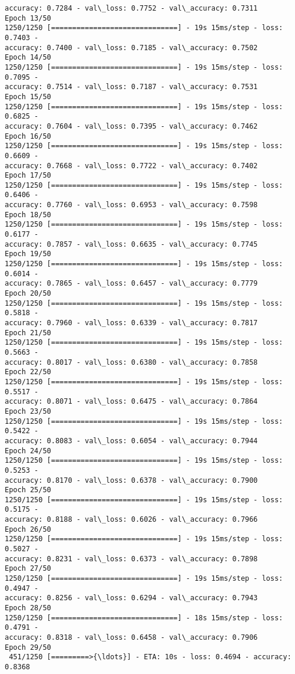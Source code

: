 \documentclass[11pt]{article}
\begin{document}
\begin{Verbatim}[commandchars=\\\{\}]
accuracy: 0.7284 - val\_loss: 0.7752 - val\_accuracy: 0.7311
Epoch 13/50
1250/1250 [==============================] - 19s 15ms/step - loss: 0.7403 -
accuracy: 0.7400 - val\_loss: 0.7185 - val\_accuracy: 0.7502
Epoch 14/50
1250/1250 [==============================] - 19s 15ms/step - loss: 0.7095 -
accuracy: 0.7514 - val\_loss: 0.7187 - val\_accuracy: 0.7531
Epoch 15/50
1250/1250 [==============================] - 19s 15ms/step - loss: 0.6825 -
accuracy: 0.7604 - val\_loss: 0.7395 - val\_accuracy: 0.7462
Epoch 16/50
1250/1250 [==============================] - 19s 15ms/step - loss: 0.6609 -
accuracy: 0.7668 - val\_loss: 0.7722 - val\_accuracy: 0.7402
Epoch 17/50
1250/1250 [==============================] - 19s 15ms/step - loss: 0.6406 -
accuracy: 0.7760 - val\_loss: 0.6953 - val\_accuracy: 0.7598
Epoch 18/50
1250/1250 [==============================] - 19s 15ms/step - loss: 0.6177 -
accuracy: 0.7857 - val\_loss: 0.6635 - val\_accuracy: 0.7745
Epoch 19/50
1250/1250 [==============================] - 19s 15ms/step - loss: 0.6014 -
accuracy: 0.7865 - val\_loss: 0.6457 - val\_accuracy: 0.7779
Epoch 20/50
1250/1250 [==============================] - 19s 15ms/step - loss: 0.5818 -
accuracy: 0.7960 - val\_loss: 0.6339 - val\_accuracy: 0.7817
Epoch 21/50
1250/1250 [==============================] - 19s 15ms/step - loss: 0.5663 -
accuracy: 0.8017 - val\_loss: 0.6380 - val\_accuracy: 0.7858
Epoch 22/50
1250/1250 [==============================] - 19s 15ms/step - loss: 0.5517 -
accuracy: 0.8071 - val\_loss: 0.6475 - val\_accuracy: 0.7864
Epoch 23/50
1250/1250 [==============================] - 19s 15ms/step - loss: 0.5422 -
accuracy: 0.8083 - val\_loss: 0.6054 - val\_accuracy: 0.7944
Epoch 24/50
1250/1250 [==============================] - 19s 15ms/step - loss: 0.5253 -
accuracy: 0.8170 - val\_loss: 0.6378 - val\_accuracy: 0.7900
Epoch 25/50
1250/1250 [==============================] - 19s 15ms/step - loss: 0.5175 -
accuracy: 0.8188 - val\_loss: 0.6026 - val\_accuracy: 0.7966
Epoch 26/50
1250/1250 [==============================] - 19s 15ms/step - loss: 0.5027 -
accuracy: 0.8231 - val\_loss: 0.6373 - val\_accuracy: 0.7898
Epoch 27/50
1250/1250 [==============================] - 19s 15ms/step - loss: 0.4947 -
accuracy: 0.8256 - val\_loss: 0.6294 - val\_accuracy: 0.7943
Epoch 28/50
1250/1250 [==============================] - 18s 15ms/step - loss: 0.4791 -
accuracy: 0.8318 - val\_loss: 0.6458 - val\_accuracy: 0.7906
Epoch 29/50
 451/1250 [=========>{\ldots}] - ETA: 10s - loss: 0.4694 - accuracy:
0.8368
    \end{Verbatim}
\end{document}
